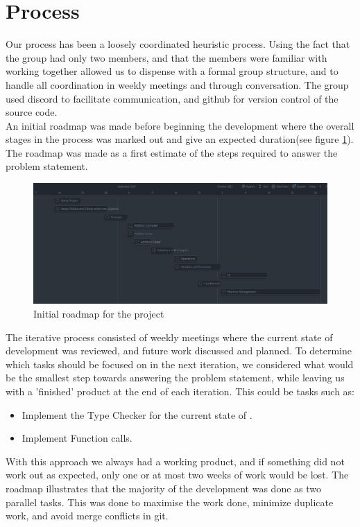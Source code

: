 \section{Process}

Our process has been a loosely coordinated heuristic process. Using the fact that the
group had only two members, and that the members were familiar with working together
allowed us to dispense with a formal group structure, and to handle all coordination
in weekly meetings and through conversation. The group used discord to facilitate
communication, and github for version control of the source code.\\

An initial roadmap was made before beginning the development where the overall
stages in the process was marked out and give an expected duration(see figure
\ref{fig:iterate}). The roadmap was made as a first estimate of the steps required to
answer the problem statement. 

\begin{figure}[h]
\centering
\includegraphics[width=\textwidth]{02-Body/Images/Roadmap.png}
\caption{Initial roadmap for the project}
\label{fig:iterate}
\end{figure}

The iterative process consisted of weekly meetings where the current state of
development was reviewed, and future work discussed and planned. To determine which
tasks should be focused on in the next iteration, we considered what would be the
smallest step towards answering the problem statement, while leaving us with a
'finished' product at the end of each iteration. This could be tasks such as:

\begin{itemize}
  \item Implement the Type Checker for the current state of \lang{}.
  \item Implement Function calls.
\end{itemize} 

With this approach we always had a working product, and if something did not work out
as expected, only one or at most two weeks of work would be lost. The roadmap illustrates
that the majority of the development was done as two parallel tasks. This was done to
maximise the work done, minimize duplicate work, and avoid merge conflicts in git.

\newpage
